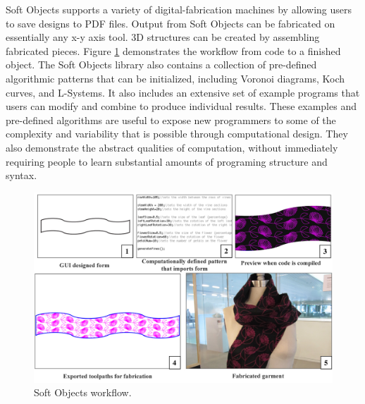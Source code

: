 Soft Objects supports a variety of digital-fabrication machines by allowing users to save designs to PDF files. Output from Soft Objects can be fabricated on essentially any x-y axis tool. 3D structures can be created by assembling fabricated pieces. Figure \ref{fig:softobjects_workflow} demonstrates the workflow from code to a finished object. 
The Soft Objects library also contains a collection of pre-defined algorithmic patterns that can be initialized, including Voronoi diagrams, Koch curves, and L-Systems. It also includes an extensive set of example programs that users can modify and combine to produce individual results. These examples and pre-defined algorithms are useful to  expose new programmers to some of the complexity and variability that is possible through computational design. They also  demonstrate the abstract qualities of computation, without immediately requiring people to learn substantial amounts of programing structure and syntax. 		

\begin{center}
\begin{figure}[h!]
\includegraphics[width=6.5in]{images/softobjects_workflow.jpg}
\caption{Soft Objects workflow.}
\label{fig:softobjects_workflow}
\end{figure}
\end{center}
		
